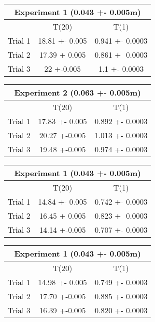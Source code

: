 

{}

\begin{table}[H]
\centering
\begin{tabular}{lcc}
\hline
\multicolumn{3}{c}{Experiment 1 (0.043 +- 0.005m)} \\ \hline
           & T(20)              & T(1)              \\
Trial 1    & 18.81 +- 0.005    & 0.941 +- 0.0003   \\
Trial 2    & 17.39 +-0.005     & 0.861 +- 0.0003   \\
Trial 3    & 22 +-0.005        & 1.1 +- 0.0003     \\ \hline
\end{tabular}
\end{table}

\begin{table}[H]
\centering
\begin{tabular}{ccc}
\hline
\multicolumn{3}{c}{Experiment 2 (0.063 +- 0.005m)}      \\ \hline
\multicolumn{1}{l}{} & T(20)          & T(1)            \\
Trial 1              & 17.83 +- 0.005 & 0.892 +- 0.0003 \\
Trial 2              & 20.27 +-0.005  & 1.013 +- 0.0003 \\
Trial 3              & 19.48 +-0.005  & 0.974 +- 0.0003 \\ \hline
\end{tabular}
\end{table}


\begin{table}[H]
\centering
\begin{tabular}{lcc}
\hline
\multicolumn{3}{c}{Experiment 1 (0.043 +- 0.005m)} \\ \hline
           & T(20)              & T(1)              \\
Trial 1    & 14.84 +- 0.005    & 0.742 +- 0.0003   \\
Trial 2    & 16.45 +-0.005     & 0.823 +- 0.0003   \\
Trial 3    & 14.14 +-0.005     & 0.707 +- 0.0003   \\ \hline
\end{tabular}
\end{table}

\begin{table}[H]
\centering
\begin{tabular}{lcc}
\hline
\multicolumn{3}{c}{Experiment 1 (0.043 +- 0.005m)} \\ \hline
           & T(20)             & T(1)              \\
Trial 1    & 14.98 +- 0.005    & 0.749 +- 0.0003   \\
Trial 2    & 17.70 +-0.005     & 0.885 +- 0.0003   \\
Trial 3    & 16.39 +-0.005     & 0.820 +- 0.0003   \\ \hline
\end{tabular}
\end{table}

